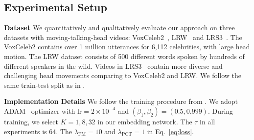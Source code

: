 \documentclass[runningheads]{llncs}
\begin{document}
\subsection{Experimental Setup}
\label{subsec:exp_setup}

\noindent \textbf{Dataset} \quad We quantitatively and qualitatively evaluate our approach on three datasets with moving-talking-head videos: VoxCeleb2~\cite{Chung18b}, LRW~\cite{Chung16} and LRS3~\cite{Afouras18d}. The VoxCeleb2 contains over 1 million utterances for 6,112 celebrities, with large head motion. The LRW dataset consists of 500 different words spoken by hundreds of different speakers in the wild. Videos in LRS3~\cite{Afouras18d} contain more diverse and challenging head movements comparing to VoxCeleb2 and LRW.  We follow the same train-test split as in \cite{Chung18b,Chung16,Afouras18d}. 

\noindent \textbf{Implementation Details} \quad We follow the training procedure from \cite{wang2018fewshotvid2vid}. We adopt ADAM~\cite{KingmaB14} optimizer with $\text{lr} = 2 \times 10^{-4}$ and $(\beta_1,\beta_2) = (0.5,0.999)$. During training, we select $K = 1,8,32$ in our embedding network. The $\tau$ in all experiments is 64. The $\lambda_{\text{FM}} = 10$ and $\lambda_{\text{PCT}} = 1$ in Eq.~\ref{eq:loss}.  
  
\end{document}
